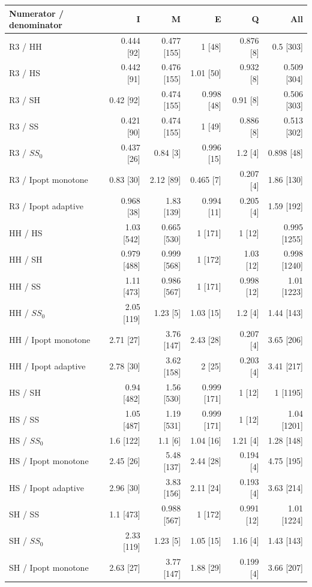 \begin{tabular}{@{}lrrrrr@{}}
\toprule
Numerator / denominator & I & M & E & Q & All\\
\midrule
R3 / HH & 0.444 [92] & 0.477 [155] & 1 [48] & 0.876 [8] & 0.5 [303]\\
R3 / HS & 0.442 [91] & 0.476 [155] & 1.01 [50] & 0.932 [8] & 0.509 [304]\\
R3 / SH & 0.42 [92] & 0.474 [155] & 0.998 [48] & 0.91 [8] & 0.506 [303]\\
R3 / SS & 0.421 [90] & 0.474 [155] & 1 [49] & 0.886 [8] & 0.513 [302]\\
R3 / $SS_0$ & 0.437 [26] & 0.84 [3] & 0.996 [15] & 1.2 [4] & 0.898 [48]\\
R3 / Ipopt monotone & 0.83 [30] & 2.12 [89] & 0.465 [7] & 0.207 [4] & 1.86 [130]\\
R3 / Ipopt adaptive & 0.968 [38] & 1.83 [139] & 0.994 [11] & 0.205 [4] & 1.59 [192]\\
HH / HS & 1.03 [542] & 0.665 [530] & 1 [171] & 1 [12] & 0.995 [1255]\\
HH / SH & 0.979 [488] & 0.999 [568] & 1 [172] & 1.03 [12] & 0.998 [1240]\\
HH / SS & 1.11 [473] & 0.986 [567] & 1 [171] & 0.998 [12] & 1.01 [1223]\\
HH / $SS_0$ & 2.05 [119] & 1.23 [5] & 1.03 [15] & 1.2 [4] & 1.44 [143]\\
HH / Ipopt monotone & 2.71 [27] & 3.76 [147] & 2.43 [28] & 0.207 [4] & 3.65 [206]\\
HH / Ipopt adaptive & 2.78 [30] & 3.62 [158] & 2 [25] & 0.203 [4] & 3.41 [217]\\
HS / SH & 0.94 [482] & 1.56 [530] & 0.999 [171] & 1 [12] & 1 [1195]\\
HS / SS & 1.05 [487] & 1.19 [531] & 0.999 [171] & 1 [12] & 1.04 [1201]\\
HS / $SS_0$ & 1.6 [122] & 1.1 [6] & 1.04 [16] & 1.21 [4] & 1.28 [148]\\
HS / Ipopt monotone & 2.45 [26] & 5.48 [137] & 2.44 [28] & 0.194 [4] & 4.75 [195]\\
HS / Ipopt adaptive & 2.96 [30] & 3.83 [156] & 2.11 [24] & 0.193 [4] & 3.63 [214]\\
SH / SS & 1.1 [473] & 0.988 [567] & 1 [172] & 0.991 [12] & 1.01 [1224]\\
SH / $SS_0$ & 2.33 [119] & 1.23 [5] & 1.05 [15] & 1.16 [4] & 1.43 [143]\\
SH / Ipopt monotone & 2.63 [27] & 3.77 [147] & 1.88 [29] & 0.199 [4] & 3.66 [207]\\

\end{tabular}
